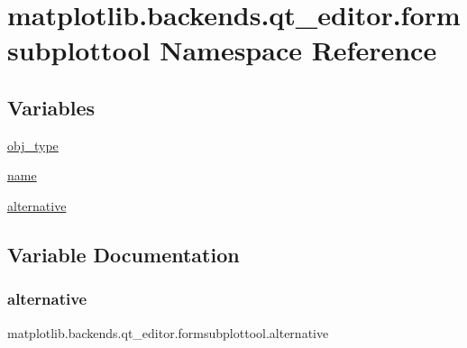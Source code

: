 \hypertarget{namespacematplotlib_1_1backends_1_1qt__editor_1_1formsubplottool}{}\section{matplotlib.\+backends.\+qt\+\_\+editor.\+formsubplottool Namespace Reference}
\label{namespacematplotlib_1_1backends_1_1qt__editor_1_1formsubplottool}
\subsection*{Variables}
\begin{DoxyCompactItemize}
\item 
\hyperlink{namespacematplotlib_1_1backends_1_1qt__editor_1_1formsubplottool_a10da7ce9f442dc07eb282360568c8558}{obj\+\_\+type}
\item 
\hyperlink{namespacematplotlib_1_1backends_1_1qt__editor_1_1formsubplottool_a1d99c30519d6507d9bc9f2e0a9710aaf}{name}
\item 
\hyperlink{namespacematplotlib_1_1backends_1_1qt__editor_1_1formsubplottool_a5131c130496457236845c00f4fae500a}{alternative}
\end{DoxyCompactItemize}


\subsection{Variable Documentation}
\mbox{\label{namespacematplotlib_1_1backends_1_1qt__editor_1_1formsubplottool_a5131c130496457236845c00f4fae500a}} 
\subsubsection{\texorpdfstring{alternative}{alternative}}
{\footnotesize\ttfamily matplotlib.\+backends.\+qt\+\_\+editor.\+formsubplottool.\+alternative}

\mbox{\label{namespacematplotlib_1_1backends_1_1qt__editor_1_1formsubplottool_a1d99c30519d6507d9bc9f2e0a9710aaf}} 

